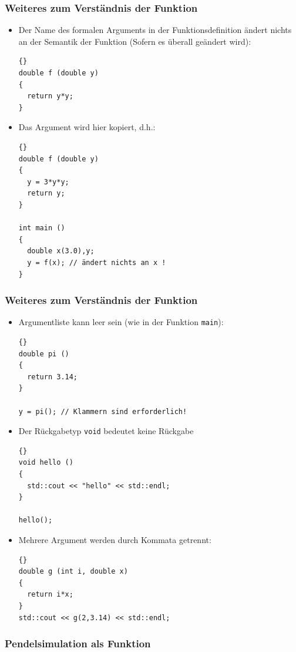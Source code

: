 \begin{frame}[fragile]
\frametitle{Weiteres zum Verständnis der Funktion}
\begin{itemize}
\item Der Name des formalen Arguments in der Funktionsdefinition
  ändert nichts an der Semantik der Funktion (Sofern es überall
  geändert wird):
{\scriptsize\begin{lstlisting}{}
double f (double y)
{
  return y*y;
}
\end{lstlisting}}

\item Das Argument wird hier kopiert, d.h.:
{\scriptsize\begin{lstlisting}{}
double f (double y)
{
  y = 3*y*y;
  return y;
}

int main ()
{
  double x(3.0),y;
  y = f(x); // ändert nichts an x !
}
\end{lstlisting}}
\end{itemize}
\end{frame}

\begin{frame}[fragile]
\frametitle{Weiteres zum Verständnis der Funktion}
\begin{itemize}
\item Argumentliste kann leer sein (wie in der Funktion
  \lstinline{main}):
{\scriptsize\begin{lstlisting}{}
double pi ()
{
  return 3.14;
}

y = pi(); // Klammern sind erforderlich!
\end{lstlisting}}

\item Der Rückgabetyp \lstinline{void} bedeutet \glqq{}keine
  Rückgabe\grqq{}

{\scriptsize\begin{lstlisting}{}
void hello ()
{
  std::cout << "hello" << std::endl;
}

hello();
\end{lstlisting}}
\item Mehrere Argument werden durch Kommata getrennt:

{\scriptsize\begin{lstlisting}{}
double g (int i, double x)
{
  return i*x;
}
std::cout << g(2,3.14) << std::endl;
\end{lstlisting}}
\end{itemize}
\end{frame}

\begin{frame}[fragile]
\frametitle{Pendelsimulation als Funktion}

\end{frame}

